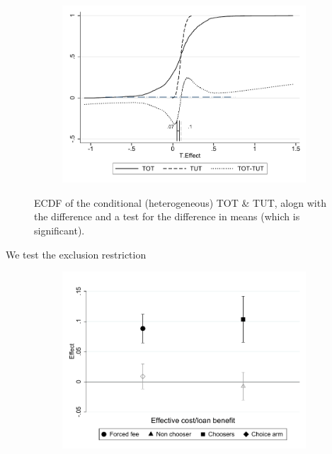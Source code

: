 \documentclass[oneside,11pt]{article}
\begin{document}
\begin{figure}[H]
     \caption{TOT-TUT CDF}
    \begin{center}
    \begin{subfigure}{0.75\textwidth}
        \centering
        \includegraphics[width=\textwidth]{Figuras/cdf_tot_tut.pdf}
    \end{subfigure}
    \end{center}
    \scriptsize
        ECDF of the conditional (heterogeneous) TOT \& TUT, alogn with the difference and a test for the difference in means (which is significant).
\end{figure}


We test the exclusion restriction

\begin{figure}[H]
     \caption{Exclusion restriction}
    \begin{center}
    \begin{subfigure}{0.75\textwidth}
        \centering
        \includegraphics[width=\textwidth]{Figuras/exclusion_restriction.pdf}
    \end{subfigure}
    \end{center}
    \scriptsize
    
\end{figure}
\end{document}

